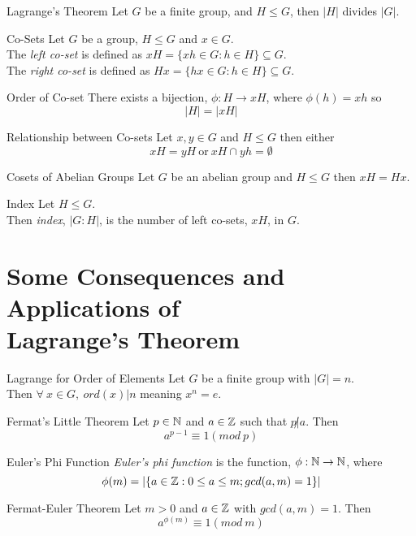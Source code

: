 \documentclass[11pt,a4paper]{article}
\begin{document}
\subtitle{Theorem 11.01 - }{Lagrange's Theorem}
Let $G$ be a finite group, and $H \leq G$, then $|H|$ divides $|G|$.\\

\subtitle{Definition 11.02 - }{Co-Sets}
Let $G$ be a group, $H \leq G$ and $x \in G$.\\
The \textit{left co-set} is defined as $xH = \{xh \in G : h \in H\} \subseteq G$.\\
The \textit{right co-set} is defined as $Hx = \{hx \in G : h \in H\} \subseteq G$.\\

\subtitle{Theorem 11.03 - }{Order of Co-set}
There exists a bijection, $\phi : H \to xH$, where $\phi(h) = xh$ so $$|H| = |xH|$$

\subtitle{Theorem 11.04 - }{Relationship between Co-sets}
Let $x, y \in G$ and $H \leq G$ then either
$$xH = yH \mathrm{\ or\ } xH \cap yh = \emptyset$$

\subtitle{Theorem 11.05 - }{Cosets of Abelian Groups}
Let $G$ be an abelian group and $H \leq G$ then $xH = Hx$.\\

\subtitle{Definition 11.06 - }{Index}
Let $H \leq G$.\\
Then \textit{index}, $|G : H|$, is the number of left co-sets, $xH$, in $G$.

\section{Some Consequences and Applications of\\ Lagrange's Theorem}

\subtitle{Propostion 12.01 - }{Lagrange for Order of Elements}
Let $G$ be a finite group with $|G| = n$.\\
Then $\forall\ x \in G,\ ord(x) | n$ meaning $x^n = e$.\\

\subtitle{Theorem 12.02 - }{Fermat's Little Theorem}
Let $p \in \mathbb{N}$ and $a \in \mathbb{Z}$ such that $p \not | a$. Then
$$a^{p-1} \equiv 1 (mod\ p)$$

\subtitle{Definition 12.03 - }{Euler's Phi Function}
\textit{Euler's phi function} is the function, $\phi : \mathbb{N} \to \mathbb{N}$, where
$$\phi(m) = |\{ a \in \mathbb{Z} : 0 \leq a \leq m; gcd(a, m) = 1 \}|$$

\subtitle{Theorem 12.04 - }{Fermat-Euler Theorem}
Let $m > 0$ and $a \in \mathbb{Z}$ with $gcd(a, m) = 1$. Then
$$a^{\phi(m)} \equiv 1 (mod\ m)$$
\end{document}

